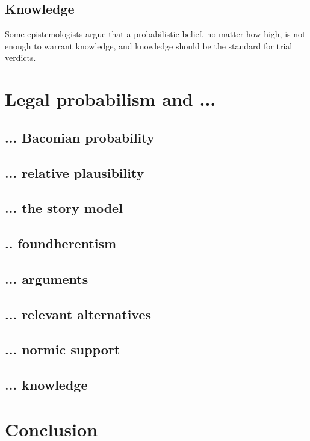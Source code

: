 \documentclass[]{book}
\begin{document}
\section{Knowledge}

Some epistemologists argue that a probabilistic belief, no matter how high, is not enough to warrant knowledge, and knowledge should be the standard for trial verdicts.

\chapter{Legal probabilism and ...}

\section{... Baconian probability}

\section{... relative plausibility}

\section{... the story model}

\section{ .. foundherentism}

\section{... arguments}

\section{... relevant alternatives}

\section{... normic support}

\section{... knowledge}

\chapter{Conclusion}
\end{document}
